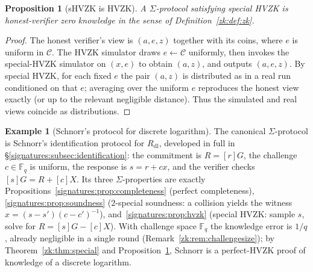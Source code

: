 \documentclass[11pt,a4paper]{article}
\newtheorem{proposition}[theorem]{Proposition}
\theoremstyle{definition}
\newtheorem{example}[theorem]{Example}
\theoremstyle{remark}
\newcommand{\Fq}{\ensuremath{\mathbb{F}_{q}}}
\begin{document}
\begin{proposition}[sHVZK is HVZK]\label{zk:prop:shvzk}
A \(\Sigma\)-protocol satisfying special HVZK is honest-verifier zero knowledge in the sense of Definition~\ref{zk:def:zk}.
\end{proposition}

\begin{proof}
The honest verifier's view is \((a, e, z)\) together with its coins, where \(e\) is uniform in \(\mathcal{C}\). The HVZK simulator draws \(e \leftarrow \mathcal{C}\) uniformly, then invokes the special-HVZK simulator on \((x, e)\) to obtain \((a, z)\), and outputs \((a, e, z)\). By special HVZK, for each fixed \(e\) the pair \((a,z)\) is distributed as in a real run conditioned on that \(e\); averaging over the uniform \(e\) reproduces the honest view exactly (or up to the relevant negligible distance). Thus the simulated and real views coincide as distributions.
\end{proof}

\begin{example}[Schnorr's protocol for discrete logarithm]\label{zk:exp:schnorr}
The canonical \(\Sigma\)-protocol is Schnorr's identification protocol for \(R_{\mathrm{dl}}\), developed in full in \S\ref{signatures:subsec:identification}: the commitment is \(R = [r]G\), the challenge \(c \in \Fq\) is uniform, the response is \(s = r + cx\), and the verifier checks \([s]G = R + [c]X\). Its three \(\Sigma\)-properties are exactly Propositions~\ref{signatures:prop:completeness} (perfect completeness), \ref{signatures:prop:soundness} (\(2\)-special soundness: a collision yields the witness \(x = (s - s')(c - c')^{-1}\)), and~\ref{signatures:prop:hvzk} (special HVZK: sample \(s\), solve for \(R = [s]G - [c]X\)). With challenge space \(\Fq\) the knowledge error is \(1/q\), already negligible in a single round (Remark~\ref{zk:rem:challengesize}); by Theorem~\ref{zk:thm:special} and Proposition~\ref{zk:prop:shvzk}, Schnorr is a perfect-HVZK proof of knowledge of a discrete logarithm.
\end{example}
\end{document}
